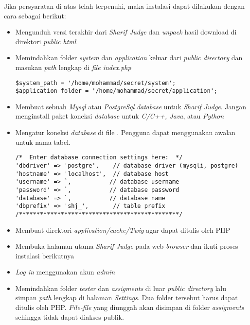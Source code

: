Jika persyaratan di atas telah terpenuhi, maka instalasi dapat dilakukan dengan cara sebagai berikut:
\begin{itemize}
	\item Mengunduh versi terakhir dari \textit{Sharif Judge} dan \textit{unpack} hasil download di direktori \textit{public html}
	\item Memindahkan folder \textit{system} dan \textit{application} keluar dari \textit{public directory} dan
	masukan \textit{path} lengkap di \textit{file index.php} 
	\begin{lstlisting}[basicstyle=\ttfamily, frame=single,
columns=fullflexible, keepspaces=true, breaklines=true]
$system_path = '/home/mohammad/secret/system';
$application_folder = '/home/mohammad/secret/application';
\end{lstlisting}
	\item Membuat sebuah \textit{Mysql} atau \textit{PostgreSql} \textit{database} untuk \textit{Sharif Judge}. Jangan menginstall paket koneksi \textit{database} untuk \textit{C/C++, Java}, atau \textit{Python}
	\item Mengatur koneksi \textit{database} di file . Pengguna dapat menggunakan awalan untuk nama tabel.
	\begin{lstlisting}[basicstyle=\ttfamily, frame=single,
columns=fullflexible, keepspaces=true, breaklines=true]
/*  Enter database connection settings here:  */
'dbdriver' => 'postgre',    // database driver (mysqli, postgre)
'hostname' => 'localhost',  // database host
'username' => `,           // database username
'password' => `,           // database password
'database' => `,           // database name
'dbprefix' => 'shj_',       // table prefix
/**********************************************/
\end{lstlisting}
	\item Membuat direktori \textit{application/cache/Twig} agar dapat ditulis oleh PHP
	\item Membuka halaman utama \textit{Sharif Judge} pada web \textit{browser} dan ikuti proses instalasi berikutnya
	\item \textit{Log in} menggunakan akun \textit{admin}
	\item Memindahkan folder \textit{tester} dan \textit{assigments} di luar \textit{public directory} lalu simpan \textit{path} lengkap di halaman \textit{Settings}. Dua folder tersebut harus dapat ditulis oleh PHP. \textit{File-file} yang diunggah akan disimpan di folder \textit{assigments} sehingga tidak dapat diakses publik.
\end{itemize}

